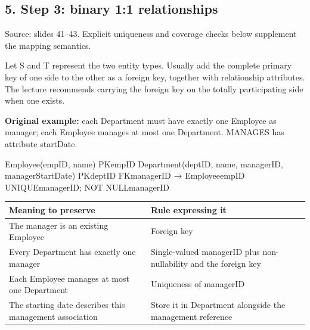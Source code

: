 \subsection{5. Step 3: binary 1:1 relationships}\label{04_er_to_relational_mapping_en-step-3-binary-11-relationships}

Source: slides 41--43. Explicit uniqueness and coverage checks below supplement the mapping semantics.

Let S and T represent the two entity types. Usually add the complete primary key of one side to the other as a foreign key, together with relationship attributes. The lecture recommends carrying the foreign key on the totally participating side when one exists.

\textbf{Original example:} each Department must have exactly one Employee as manager; each Employee manages at most one Department. MANAGES has attribute startDate.

\begin{StudyCode}
Employee(empID, name)                      PK{empID}
Department(deptID, name, managerID, managerStartDate)
  PK{deptID}
  FK{managerID} → Employee{empID}
  UNIQUE{managerID}; NOT NULL{managerID}
\end{StudyCode}

\begin{longtable}[]{@{}
  >{\raggedright\arraybackslash}p{}
  >{\raggedright\arraybackslash}p{}@{}}
\toprule\noalign{}
\begin{minipage}[b]{\linewidth}\raggedright
Meaning to preserve
\end{minipage} & \begin{minipage}[b]{\linewidth}\raggedright
Rule expressing it
\end{minipage} \\
\midrule\noalign{}
\endhead
\bottomrule\noalign{}
\endlastfoot
The manager is an existing Employee & Foreign key \\
Every Department has exactly one manager & Single-valued managerID plus non-nullability and the foreign key \\
Each Employee manages at most one Department & Uniqueness of managerID \\
The starting date describes this management association & Store it in Department alongside the management reference \\
\end{longtable}

